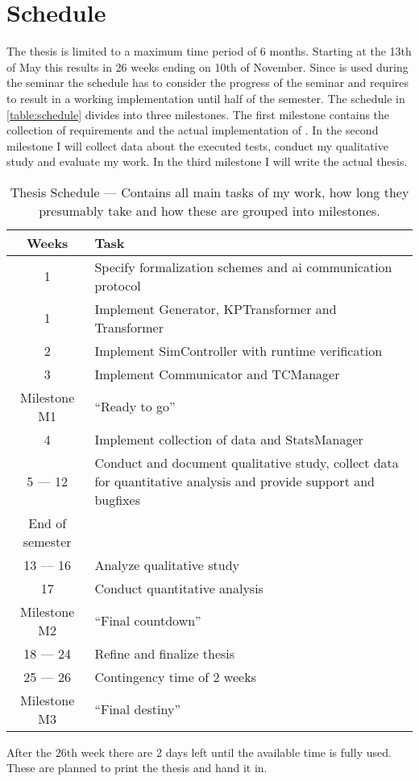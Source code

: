 \section{Schedule}



The thesis is limited to a maximum time period of 6 months.
Starting at the 13th of May this results in 26 weeks ending on 10th of November.
Since \drivebuild{} is used during the seminar the schedule has to consider the progress of the seminar and requires to result in a working implementation until half of the semester.
The schedule in \autoref{table:schedule} divides into three milestones.
The first milestone contains the collection of requirements and the actual implementation of \drivebuild{}.
In the second milestone I will collect data about the executed tests, conduct my qualitative study and evaluate my work.
In the third milestone I will write the actual thesis.

\begin{table}[h!tp]
\centering
\caption{%
    Thesis Schedule --- Contains all main tasks of my work, how long they presumably take and how these are grouped into milestones.
}
\medskip
\begin{tabularx}{\linewidth}{c X}
\toprule
\bfseries Weeks   & \bfseries Task\\
\midrule
1                 & Specify formalization schemes and \gls{ai} communication protocol\\
1                 & Implement Generator, KPTransformer and Transformer\\
2                 & Implement SimController with runtime verification\\
3                 & Implement Communicator and TCManager\\
Milestone M1      & ``Ready to go''\\
\midrule
4                 & Implement collection of data and StatsManager\\
5 --- 12          & Conduct and document qualitative study, collect data for quantitative analysis and provide support and bugfixes\\
End of semester\\
13 --- 16         & Analyze qualitative study\\
17                & Conduct quantitative analysis\\
Milestone M2      & ``Final countdown''\\
\midrule
18 --- 24         & Refine and finalize thesis\\
25 --- 26         & Contingency time of 2 weeks\\
Milestone M3      & ``Final destiny''\\
\bottomrule
\end{tabularx}\label{table:schedule}
\end{table}

After the 26th week there are 2 days left until the available time is fully used.
These are planned to print the thesis and hand it in.
